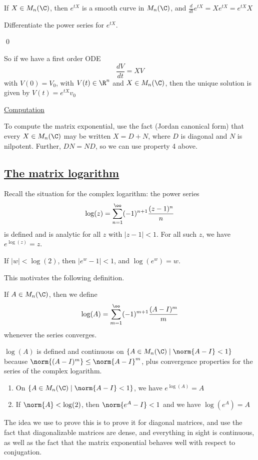 \documentclass[x11names,reqno,14pt]{extarticle}
\newcommand{\dd}[2]{\frac{d#1}{d#2}}
\begin{document}
\prop

If $X \in M_n(\C)$, then $e^{tX}$ is a smooth curve in $M_n(\C)$, and $\dd{}{t}e^{tX} = Xe^{tX} = e^{tX}X$ 

\proof

Differentiate the power series for $e^{tX}$. 

\qed

So if we have a first order ODE
\[
\dd{V}{t} = XV
\]
with $V(0) = V_0$, with $V(t) \in \R^n$ and $X \in M_n(\C)$, then the unique solution is given by $V(t) = e^{tX}v_0$

\underline{Computation}

To compute the matrix exponential, use the fact (Jordan canonical form) that every $X \in M_n(\C)$ may be written $X = D + N$, where $D$ is diagonal and $N$ is nilpotent. Further, $DN = ND$, so we can use property 4 above. 

\subsection*{\underline{The matrix logarithm}}

Recall the situation for the complex logarithm: the power series 
\[
\log(z) = \sum_{n=1}^\oo (-1)^{n+1}\frac{(z-1)^n}{n}
\]
is defined and is analytic for all $z$ with $|z - 1| < 1$. For all such $z$, we have $e^{\log(z)} = z$. 

If $|w| < \log(2)$, then $|e^w - 1| < 1$, and $\log(e^w) = w$. 

This motivates the following definition. 


If $A \in M_n(\C)$, then we define 
\[
\log(A) = \sum_{m=1}^\oo(-1)^{m+1}\frac{(A-I)^m}{m}
\]
whenever the series converges.

$\log(A)$ is defined and continuous on $\{A \in M_n(\C) \mid \norm{A-I}<1\}$ because $\norm{(A-I)^m} \leq \norm{A-I}^m$, plus convergence properties for the series of the complex logarithm.

\begin{enumerate}[label=(\alph*)]

\item On $\{A \in M_n(\C) \mid \norm{A-I}<1\}$, we have $e^{\log(A)} = A$

\item If $\norm{A}<\log(2)$, then $\norm{e^A-I} < 1$ and we have $\log(e^A) = A$

\end{enumerate}

The idea we use to prove this is to prove it for diagonal matrices, and use the fact that diagonalizable matrices are dense, and everything in sight is continuous, as well as the fact that the matrix exponential behaves well with respect to conjugation.
\end{document}
